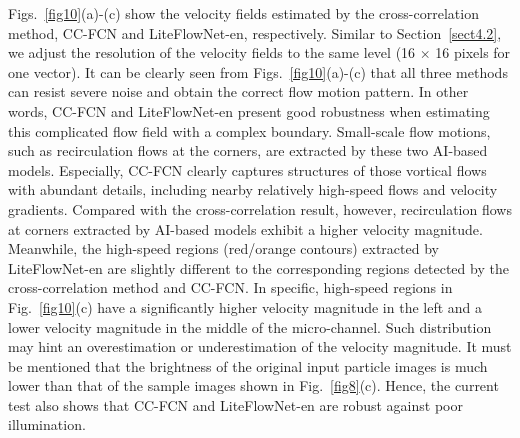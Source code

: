 \documentclass[%
 aip,
 amsmath,amssymb,
 reprint,%
]{revtex4-1}
\begin{document}
Figs.~\ref{fig10}(a)-(c) show the velocity fields estimated by the cross-correlation method, CC-FCN and LiteFlowNet-en, respectively.
Similar to Section~\ref{sect4.2}, we adjust the resolution of the velocity fields to the same level (16 $\times$ 16 pixels for one vector).
It can be clearly seen from Figs.~\ref{fig10}(a)-(c) that all three methods can resist severe noise and obtain the correct flow motion pattern.
In other words, CC-FCN and LiteFlowNet-en present good robustness when estimating this complicated flow field with a complex boundary.
Small-scale flow motions, such as recirculation flows at the corners, are extracted by these two AI-based models.
Especially, CC-FCN clearly captures structures of those vortical flows with abundant details, including nearby relatively high-speed flows and velocity gradients.
Compared with the cross-correlation result, however, recirculation flows at corners extracted by AI-based models exhibit a higher velocity magnitude.
Meanwhile, the high-speed regions (red/orange contours) extracted by LiteFlowNet-en are slightly different to the corresponding regions detected by the cross-correlation method and CC-FCN.
In specific, high-speed regions in Fig.~\ref{fig10}(c) have a significantly higher velocity magnitude in the left and a lower velocity magnitude in the middle of the micro-channel.
Such distribution may hint an overestimation or underestimation of the velocity magnitude.
It must be mentioned that the brightness of the original input particle images is much lower than that of the sample images shown in Fig.~\ref{fig8}(c).
Hence, the current test also shows that CC-FCN and LiteFlowNet-en are robust against poor illumination.

\end{document}
